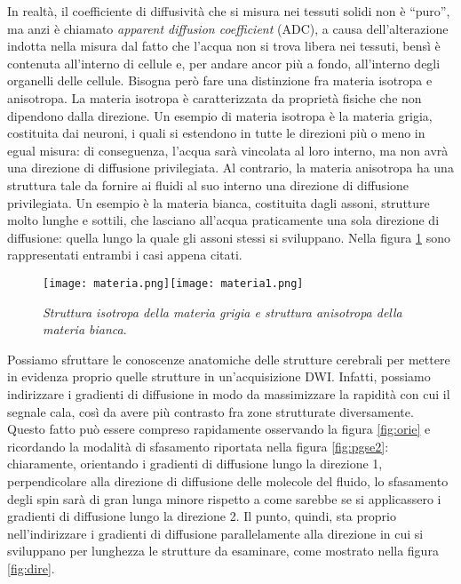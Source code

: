 \documentclass{report}
\newcommand{\virgolette}[1]{``#1''}
\newcommand{\figref}[1]{figura \ref{#1}}
\numberwithin{equation}{section}
\numberwithin{figure}{section}
\begin{document}
In realtà, il coefficiente di diffusività che si misura nei tessuti solidi non è \virgolette{puro}, ma anzi è chiamato \textit{apparent diffusion coefficient} (ADC), a causa dell'alterazione indotta nella misura dal fatto che l'acqua non si trova libera nei tessuti, bensì è contenuta all'interno di cellule e, per andare ancor più a fondo, all'interno degli organelli delle cellule. Bisogna però fare una distinzione fra materia isotropa e anisotropa. La materia isotropa è caratterizzata da proprietà fisiche che non dipendono dalla direzione. Un esempio di materia isotropa è la materia grigia, costituita dai neuroni, i quali si estendono in tutte le direzioni più o meno in egual misura: di conseguenza, l'acqua sarà vincolata al loro interno, ma non avrà una direzione di diffusione privilegiata. Al contrario, la materia anisotropa ha una struttura tale da fornire ai fluidi al suo interno una direzione di diffusione privilegiata. Un esempio è la materia bianca, costituita dagli assoni, strutture molto lunghe e sottili, che lasciano all'acqua praticamente una sola direzione di diffusione: quella lungo la quale gli assoni stessi si sviluppano. Nella \figref{fig:materia} sono rappresentati entrambi i casi appena citati.

\begin{figure}[htp]
\centering
\texttt{[image: materia.png]}\quad\texttt{[image: materia1.png]}
\caption{\label{fig:materia} \textit{Struttura isotropa della materia grigia e struttura anisotropa della materia bianca}.}
\end{figure}

Possiamo sfruttare le conoscenze anatomiche delle strutture cerebrali per mettere in evidenza proprio quelle strutture in un'acquisizione DWI. Infatti, possiamo indirizzare i gradienti di diffusione in modo da massimizzare la rapidità con cui il segnale cala, così da avere più contrasto fra zone strutturate diversamente. Questo fatto può essere compreso rapidamente osservando la \figref{fig:orie} e ricordando la modalità di sfasamento riportata nella \figref{fig:pgse2}: chiaramente, orientando i gradienti di diffusione lungo la direzione 1, perpendicolare alla direzione di diffusione delle molecole del fluido, lo sfasamento degli spin sarà di gran lunga minore rispetto a come sarebbe se si applicassero i gradienti di diffusione lungo la direzione 2. Il punto, quindi, sta proprio nell'indirizzare i gradienti di diffusione parallelamente alla direzione in cui si sviluppano per lunghezza le strutture da esaminare, come mostrato nella \figref{fig:dire}.
\end{document}
